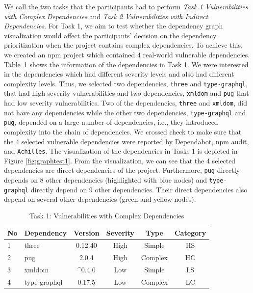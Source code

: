\documentclass[conference]{IEEEtran}
\newcommand{\FIXME}[1]{{\color{red}\textsf{FIXME: #1}}}
\begin{document}
	We call the two tasks that the participants had to perform \textit{Task 1 Vulnerabilities with Complex Dependencies} and \textit{Task 2 Vulnerabilities with Indirect Dependencies}. For Task 1, we aim to test whether the dependency graph visualization  would affect the participants’ decision on the dependency prioritization when the project contains complex dependencies. To achieve this, we created an npm project which contained 4 real-world vulnerable dependencies. 
	Table~\ref{table:cha-teat1} shows the information of the dependencies in Task 1. 
	We were interested in the dependencies which had different severity levels and also had different complexity levels. Thus, we selected two dependencies, \texttt{three} and \texttt{type-graphql}, that had high severity vulnerabilities and two dependencies, \texttt{xmldom} and \texttt{pug} that had low severity vulnerabilities. Two of the dependencies, \texttt{three} and \texttt{xmldom}, did not have any dependencies while the other two dependencies, \texttt{type-graphql} and \texttt{pug}, depended on a large number of dependencies, i.e., they introduced complexity into the chain of dependencies. 
	We crossed check to make sure that the 4 selected vulnerable dependencies were reported by Dependabot, npm audit, and \texttt{Achilles}. The visualization of the dependencies in Tasks 1 is depicted in Figure \ref{fig:graphtest1}. 
	From the visualization, we can see %
	that the 4 selected dependencies are direct dependencies of the project. Furthermore, \texttt{pug} directly depends on 8 other dependencies (highlighted with blue nodes) and \texttt{type-graphql} directly depend on 9 other dependencies. Their direct dependencies also depend on several other dependencies (green and yellow nodes).
	
	\begin{table}[tb]
		\centering
		\caption{Task 1: Vulnerabilities with Complex Dependencies}
		\begin{tabular}{llcccc}
			\toprule
			No & Dependency & Version & Severity & Type & Category \\
			\midrule
			1 & three & 0.12.40 & High & Simple & HS \\
			2 & pug & 2.0.4 & High & Complex &  HC \\
			3 & xmldom & \^{}0.4.0 & Low & Simple & LS \\
			4 & type-graphql & 0.17.5 & Low & Complex & LC \\
			\bottomrule
		\end{tabular}
		\label{table:cha-teat1}
	\end{table}
	
\end{document}
